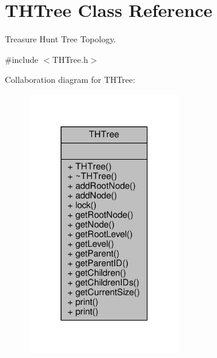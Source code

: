\hypertarget{classTHTree}{}\section{T\+H\+Tree Class Reference}
\label{classTHTree}


Treasure Hunt Tree Topology.  




{\ttfamily \#include $<$T\+H\+Tree.\+h$>$}



Collaboration diagram for T\+H\+Tree\+:
\nopagebreak
\begin{figure}[H]
\begin{center}
\leavevmode
\includegraphics[width=187pt]{classTHTree__coll__graph}
\end{center}
\end{figure}
